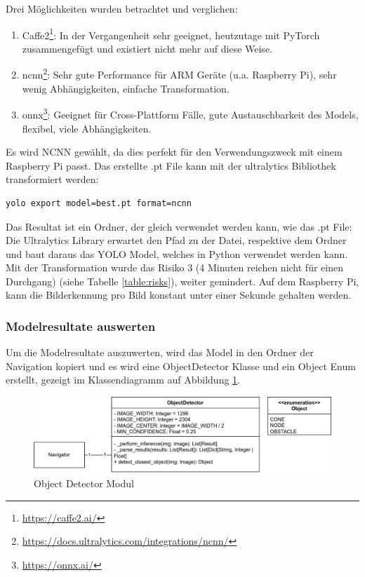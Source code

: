 Drei Möglichkeiten wurden betrachtet und verglichen:

\begin{enumerate}
    \item Caffe2\footnote{\url{https://caffe2.ai/}}: In der Vergangenheit sehr geeignet, heutzutage mit PyTorch zusammengefügt und existiert nicht mehr auf diese Weise.\cite{caffe2}
    \item \acrfull{ncnn}\footnote{\url{https://docs.ultralytics.com/integrations/ncnn/}}: Sehr gute Performance für ARM Geräte (u.a. Raspberry Pi), sehr wenig Abhängigkeiten, einfache Transformation.\cite{ncnn-bib}
    \item \acrfull{onnx}\footnote{\url{https://onnx.ai/}}: Geeignet für  Cross-Plattform Fälle, gute Austauschbarkeit des Models, flexibel, viele Abhängigkeiten.\cite{onnx-bib}
\end{enumerate}

Es wird NCNN gewählt, da dies perfekt für den Verwendungszweck mit einem Raspberry Pi passt. Das erstellte .pt File kann mit der ultralytics Bibliothek transformiert werden:

\begin{verbatim}
yolo export model=best.pt format=ncnn
\end{verbatim}

Das Resultat ist ein Ordner, der gleich verwendet werden kann, wie das .pt File: Die Ultralytics Library erwartet den Pfad zu der Datei, respektive dem Ordner und baut daraus das YOLO Model, welches in Python verwendet werden kann. Mit der Transformation wurde das Risiko 3 (4 Minuten reichen nicht für einen Durchgang) (siehe Tabelle \ref{table:risks}), weiter gemindert. Auf dem Raspberry Pi, kann die Bilderkennung pro Bild konstant unter einer Sekunde gehalten werden.

\subsubsection{Modelresultate auswerten}
\label{model-results}

Um die Modelresultate auszuwerten, wird das Model in den Ordner der Navigation kopiert und es wird eine ObjectDetector Klasse und ein Object Enum erstellt, gezeigt im Klassendiagramm auf Abbildung \ref{fig:nav-object-detector}.

 \begin{figure}[H]
\centering
\includegraphics[width= \textwidth ]{assets/IT/robot-sw-architecture-object-detector.png}
\caption{Object Detector Modul}
\label{fig:nav-object-detector}
\end{figure}

